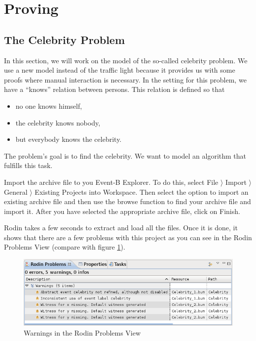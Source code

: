 \section{Proving}
\label{tut_proving}


\subsection{The Celebrity Problem}
\label{tut_celebrity_problem}

In this section, we will work on the model of the so-called celebrity problem.
We use a new model instead of the traffic light because it provides us with
  some proofs where manual interaction is necessary.
In the setting for this problem, we have a ``knows'' relation between persons.
This relation is defined so that
\begin{itemize}
	\item no one knows himself,
	\item the celebrity knows nobody,
	\item but everybody knows the celebrity.
\end{itemize}    
The problem's goal is to find the celebrity.
We want to model an algorithm that fulfills this task.


Import the archive file  to you Event-B Explorer. To do this, select \textsf{File $\rangle $ Import $\rangle $ General $\rangle $ Existing Projects into Workspace}. Then select the option to import an existing archive file and then use the browse function to find your archive file and import it. After you have selected the appropriate archive file, click on \textsf{Finish}.

Rodin takes a few seconds to extract and load all the files. Once it is done, it shows that there are a few problems with this project as you can see in the Rodin Problems View (compare with figure \ref{fig_tut_08_rodin_problemview}).

\begin{figure}[!ht]
\begin{center}
	\includegraphics{img/tutorial/tut_08_rodin_problems.png}
	\caption{Warnings in the Rodin Problems View}
	\label{fig_tut_08_rodin_problemview}
\end{center}
\end{figure}

